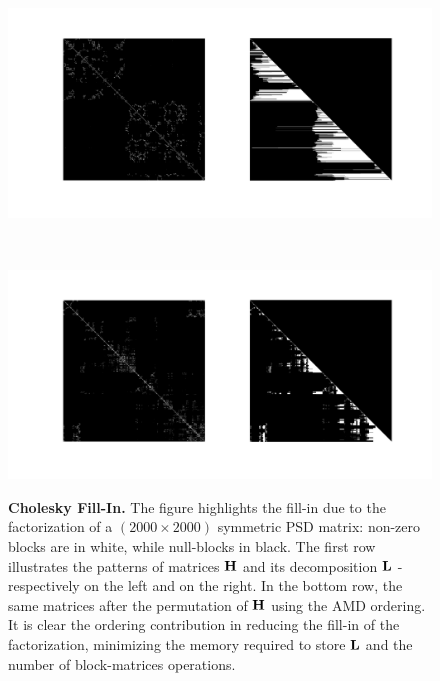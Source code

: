 \begin{figure}[!hbt]
    \centering
    \begin{minipage}[t!]{\textwidth}
        \centering
        \includegraphics[width=\textwidth]{figures/04_solvingSe3/h_l_no_permutation.pdf}
        \label{fig:cholesky_fill_in_no_odering}
    \end{minipage}\\
    \begin{minipage}[t!]{\textwidth}
        \centering
        \includegraphics[width=\textwidth]{figures/04_solvingSe3/h_l_amd.pdf}
        \label{fig:cholesky_fill_in_amd}
    \end{minipage}%
    \caption{\textbf{Cholesky Fill-In.} The figure highlights the fill-in due to the factorization of a $(2000\times2000)$ symmetric PSD matrix: non-zero blocks are in white, while null-blocks in black. The first row illustrates the patterns of matrices $\mathbf{H}$ and its decomposition $\mathbf{L}$ - respectively on the left and on the right. In the bottom row, the same matrices after the permutation of $\mathbf{H}$ using the AMD ordering. It is clear the ordering contribution in reducing the fill-in of the factorization, minimizing the memory required to store $\mathbf{L}$ and the number of block-matrices operations.} 
    \label{fig:cholesky_fill_in}
\end{figure}


